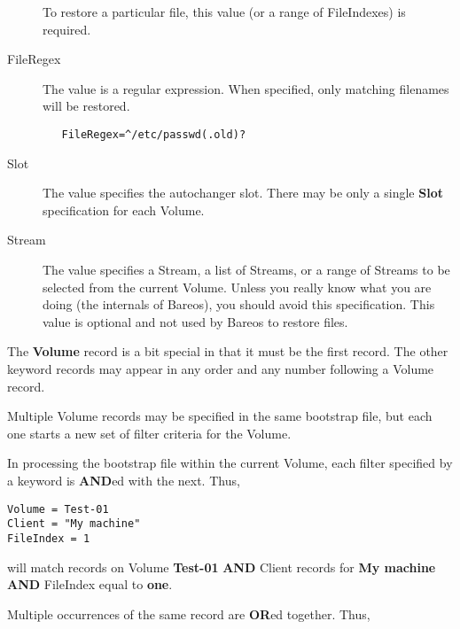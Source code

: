 \begin{description}
   To restore a particular file, this value (or a range of FileIndexes) is
   required.

\item [FileRegex]
   The value is a regular expression.  When specified, only matching
   filenames will be restored.

\begin{verbatim}
   FileRegex=^/etc/passwd(.old)?
\end{verbatim}

\item [Slot]
   The value specifies the autochanger slot. There may  be only a single {\bf
   Slot} specification for each Volume.

\item [Stream]
   The value specifies a Stream, a list of Streams,  or a range of Streams to be
   selected from the current Volume.  Unless you really know what you are doing
   (the internals of  Bareos), you should avoid this specification.
   This value is optional and not used by Bareos to restore files.

%
\end{description}

The {\bf Volume} record is a bit special in that it must be the first record.
The other keyword records may appear in any order and any number following a
Volume record.

Multiple Volume records may be specified in the same bootstrap file, but each
one starts a new set of filter criteria for the Volume.

In processing the bootstrap file within the current Volume, each filter
specified by a keyword is {\bf AND}ed with the next. Thus,

\footnotesize
\begin{verbatim}
Volume = Test-01
Client = "My machine"
FileIndex = 1
\end{verbatim}
\normalsize

will match records on Volume {\bf Test-01} {\bf AND} Client records for {\bf
My machine} {\bf AND} FileIndex equal to {\bf one}.

Multiple occurrences of the same record are {\bf OR}ed together. Thus,

